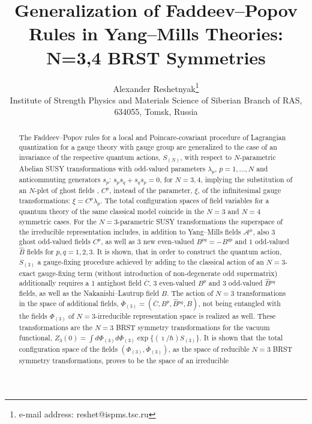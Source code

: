 \documentclass[10pt]{article}
\begin{document}
\title{{\Large
Generalization of Faddeev--Popov Rules in Yang--Mills Theories: N=3,4 BRST Symmetries}}
\author{ Alexander Reshetnyak\thanks{%
e-mail address: reshet@ispms.tsc.ru}\\
Institute of Strength Physics and Materials Science of Siberian Branch of  RAS, \\
 634055, Tomsk,
Russia}
\date{}
\maketitle

\begin{abstract}
The Faddeev--Popov rules for a local and Poincare-covariant
procedure of Lagrangian quantization for a gauge theory with gauge
group are generalized to the case of an invariance of the
respective quantum actions, $S_{(N)}$,  with respect to $N$-parametric Abelian SUSY transformations with odd-valued   parameters $\lambda_p$, $p=1,...,N$ and anticommuting generators $s_p$:
$s_p s_q+ s_q s_p =0$, for $N=3,4$, implying the substitution of an $N$-plet of  ghost fields , $C^p$, instead of the  parameter, $\xi$, of  the infinitesimal gauge transformations: $\xi = C^p\lambda_p$.
The total configuration spaces of field variables for a  quantum theory of the same classical model coincide  in the $N=3$ and $N=4$ symmetric cases.
  For the  $N=3$-parametric SUSY transformations the superspace of the irreducible representation includes, in addition to  Yang--Mills fields $\mathcal{A}^\mu$,
 also $3$ ghost odd-valued fields $C^p$, as well as  $3$ new  even-valued  $B^{pq}=-B^{qp}$ and $1$ odd-valued $\widehat{B}$ fields for $p,q=1,2,3$.
It is shown, that in order to construct the quantum action, $S_{(3)}$  a gauge-fixing procedure  achieved by adding to the  classical action of an $N=3$-exact gauge-fixing term (without introduction of non-degenerate odd supermatrix) additionally requires a $1$ antighost field $\overline{C}$, $3$  even-valued  ${B}^{p}$ and $3$ odd-valued $\widehat{B}{}^{pq}$ fields, as well as the Nakanishi--Lautrup field $B$.
  The action of $N=3$ transformations in the space of additional fields, $\overline{\Phi}_{(3)}= (\overline{C}, {B}^{p}, \widehat{B}{}^{pq}, B)$,  not being entangled with  the fields ${\Phi}_{(3)}$ of $N=3$-irreducible representation space is realized as well. These transformations are the  $N=3$ BRST symmetry transformations for the vacuum functional, $Z_3(0)=\int d \Phi_{(3)}d \overline{\Phi}_{(3)} \exp \{(\imath/\hbar )S_{(3)}\}$. It is shown that  the total configuration space of the fields $(\Phi_{(3)}, \overline{\Phi}_{(3)})$, as the space of reducible $N=3$ BRST symmetry transformations, proves to be the space of an irreducible

\end{abstract}
\end{document}
